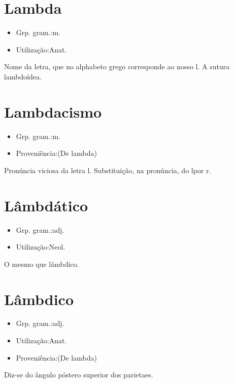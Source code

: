 \section{Lambda}
\begin{itemize}
\item {Grp. gram.:m.}
\end{itemize}
\begin{itemize}
\item {Utilização:Anat.}
\end{itemize}
Nome da letra, que no alphabeto grego corresponde ao nosso \textunderscore l\textunderscore .
A sutura lambdoídea.
\section{Lambdacismo}
\begin{itemize}
\item {Grp. gram.:m.}
\end{itemize}
\begin{itemize}
\item {Proveniência:(De \textunderscore lambda\textunderscore )}
\end{itemize}
Pronúncia viciosa da letra \textunderscore l\textunderscore .
Substituição, na pronúncia, do \textunderscore l\textunderscore  por \textunderscore r\textunderscore .
\section{Lâmbdático}
\begin{itemize}
\item {Grp. gram.:adj.}
\end{itemize}
\begin{itemize}
\item {Utilização:Neol.}
\end{itemize}
O mesmo que \textunderscore lâmbdico\textunderscore .
\section{Lâmbdico}
\begin{itemize}
\item {Grp. gram.:adj.}
\end{itemize}
\begin{itemize}
\item {Utilização:Anat.}
\end{itemize}
\begin{itemize}
\item {Proveniência:(De \textunderscore lambda\textunderscore )}
\end{itemize}
Diz-se do ângulo póstero superior dos parietaes.
